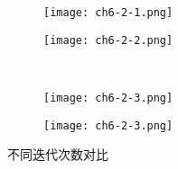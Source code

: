 \begin{figure}[H]
    \centering
    \begin{subfigure}[t]{0.5\linewidth}
        \captionsetup{justification=centering}
        \begin{minipage}[b]{1\linewidth}
            \centering
            \texttt{[image: ch6-2-1.png]}
            \caption{}
        \end{minipage}
    \end{subfigure}
    \hspace{-5em}
    \begin{subfigure}[t]{0.5\linewidth}
        \captionsetup{justification=centering}
        \begin{minipage}[b]{1\linewidth}
            \centering
            \texttt{[image: ch6-2-2.png]}
            \caption{}
        \end{minipage}
    \end{subfigure}\\
    \begin{subfigure}[t]{0.5\linewidth}
        \captionsetup{justification=centering}
        \begin{minipage}[b]{1\linewidth}
            \centering
            \texttt{[image: ch6-2-3.png]}
            \caption{}
        \end{minipage}
    \end{subfigure}
    \hspace{-5em}
    \begin{subfigure}[t]{0.5\linewidth}
        \captionsetup{justification=centering}
        \begin{minipage}[b]{1\linewidth}
            \centering
            \texttt{[image: ch6-2-3.png]}
            \caption{}
        \end{minipage}
    \end{subfigure}
    \caption{不同迭代次数对比}
    \label{f.ch6-2}
\end{figure}